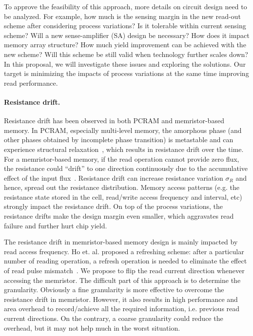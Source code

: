 To approve the feasibility of this approach, more details on circuit design need to be analyzed. For example, how much is the sensing margin in the new read-out scheme after considering process variations? Is it tolerable within current sensing scheme? Will a new sense-amplifier (SA) design be necessary? How does it impact memory array structure? How much yield improvement can be achieved with the new scheme? Will this scheme be still valid when technology further scales down? In this proposal, we will investigate these issues and exploring the solutions. Our target is minimizing the impacts of process variations at the same time improving read performance.

\paragraph{Resistance drift.} Resistance drift has been observed in both PCRAM and memristor-based memory. In PCRAM, especially multi-level memory, the amorphous phase (and other phases obtained by incomplete phase transition) is metastable and can experience structural relaxation~\cite{Pirovano04}, which results in resistance drift over the time. For a memristor-based memory, if the read operation cannot provide zero flux, the resistance could ``drift'' to one direction continuously due to the accumulative effect of the input flux~\cite{Ho09}. Resistance drift can increase resistance variation $\sigma_R$ and hence, spread out the resistance distribution. Memory access patterns (e.g. the resistance state stored in the cell, read/write access frequency and interval, etc) strongly impact the resistance drift. On top of the process variations, the resistance drifts make the design margin even smaller, which aggravates read failure and further hurt chip yield.

The resistance drift in memristor-based memory design is mainly impacted by read access frequency. Ho et. al. proposed a refreshing scheme: after a particular number of reading operation, a refresh operation is needed to eliminate the effect of read pulse mismatch~\cite{Ho09}. We propose to flip the read current direction whenever accessing the memristor. The difficult part of this approach is to determine the granularity. Obviously a fine granularity is more effective to overcome the resistance drift in memristor. However, it also results in high performance and area overhead to record/achieve all the required information, i.e. previous read current directions. On the contrary, a coarse granularity could reduce the overhead, but it may not help much in the worst situation.


